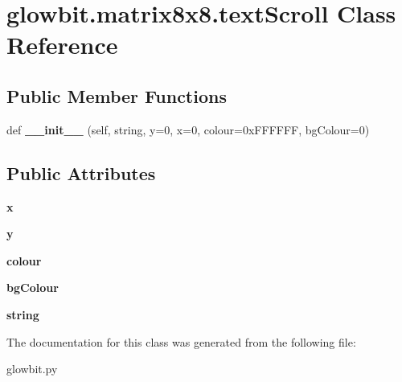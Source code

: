 \hypertarget{classglowbit_1_1matrix8x8_1_1textScroll}{}\section{glowbit.\+matrix8x8.\+text\+Scroll Class Reference}
\label{classglowbit_1_1matrix8x8_1_1textScroll}
\subsection*{Public Member Functions}
\begin{DoxyCompactItemize}
\item 
\mbox{\label{classglowbit_1_1matrix8x8_1_1textScroll_a4249d0c715faf3146f900ef070fc0360}} 
def {\bfseries \+\_\+\+\_\+init\+\_\+\+\_\+} (self, string, y=0, x=0, colour=0x\+F\+F\+F\+F\+F\+F, bg\+Colour=0)
\end{DoxyCompactItemize}
\subsection*{Public Attributes}
\begin{DoxyCompactItemize}
\item 
\mbox{\label{classglowbit_1_1matrix8x8_1_1textScroll_a312c5b72b8ae76c6a04be069ec4167a3}} 
{\bfseries x}
\item 
\mbox{\label{classglowbit_1_1matrix8x8_1_1textScroll_a6e7ff4ac73a3434911cb92b7093032a0}} 
{\bfseries y}
\item 
\mbox{\label{classglowbit_1_1matrix8x8_1_1textScroll_aaf894a77ea70a49cedf7d0de28c1deb8}} 
{\bfseries colour}
\item 
\mbox{\label{classglowbit_1_1matrix8x8_1_1textScroll_ac99afe118a82f3fc6ebcd09ce1ce2613}} 
{\bfseries bg\+Colour}
\item 
\mbox{\label{classglowbit_1_1matrix8x8_1_1textScroll_aa4cb9f51546632a1c6b82c425ca80a7f}} 
{\bfseries string}
\end{DoxyCompactItemize}


The documentation for this class was generated from the following file\+:\begin{DoxyCompactItemize}
\item 
glowbit.\+py\end{DoxyCompactItemize}
